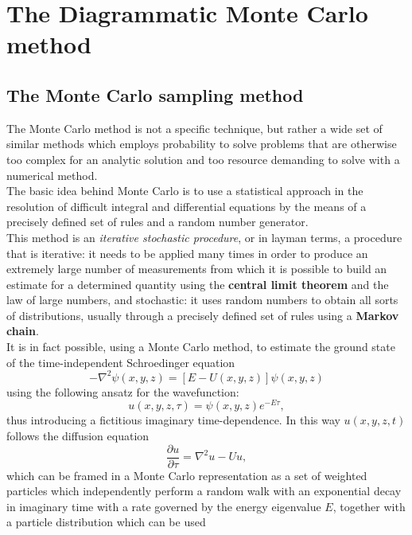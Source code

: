 \section{The Diagrammatic Monte Carlo method}
\subsection{The Monte Carlo sampling method}
The Monte Carlo method is not a specific technique, but rather a wide set of similar methods which employs probability to solve problems 
that are otherwise too complex for an analytic solution and too resource demanding to solve with a numerical method.\\
The basic idea behind Monte Carlo is to use a statistical approach in the resolution of difficult integral and differential equations 
\cite{metropolis1949monte} by the means of a precisely defined set of rules and a random number generator.\\
This method is an \textit{iterative stochastic procedure}, or in layman terms, a procedure that is iterative: it needs to be applied many times in 
order to produce an extremely large number of measurements from which it is possible to build an estimate for a determined quantity 
using the \textbf{central limit theorem} and the law of large numbers, and stochastic: it uses random numbers to obtain all sorts of distributions, 
usually through a precisely defined set of rules using a \textbf{Markov chain}.\\
It is in fact possible, using a Monte Carlo method, to estimate the ground state of the time-independent Schroedinger equation \cite{gubernatis2016quantum}
\begin{equation}
    -\nabla^2\psi(x,y,z)=\left[E-U(x,y,z)\right]\psi(x,y,z)
\end{equation}
using the following ansatz for the wavefunction:
\begin{equation}
    u(x,y,z,\tau)=\psi(x,y,z)e^{-E\tau},
\end{equation}
thus introducing a fictitious imaginary time-dependence. In this way $u(x,y,z,t)$ follows the diffusion equation
\begin{equation}
    \frac{\partial u}{\partial \tau}=\nabla^2u-Uu,
\end{equation}
which can be framed in a Monte Carlo representation as a set of weighted particles which independently perform a random walk with an 
exponential decay in imaginary time with a rate governed by the energy eigenvalue $E$, together with a particle distribution which can be used 
